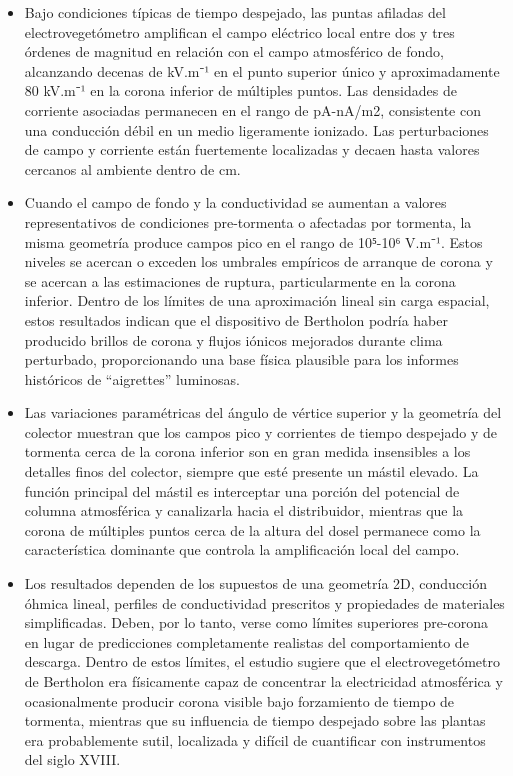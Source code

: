 \documentclass[
]{article}
\begin{document}
\begin{itemize}
\item
  Bajo condiciones típicas de tiempo despejado, las puntas afiladas del
  electrovegetómetro amplifican el campo eléctrico local entre dos y
  tres órdenes de magnitud en relación con el campo atmosférico de
  fondo, alcanzando decenas de kV.m⁻¹ en el punto superior único y
  aproximadamente 80 kV.m⁻¹ en la corona inferior de múltiples puntos.
  Las densidades de corriente asociadas permanecen en el rango de
  pA-nA/m2, consistente con una conducción débil en un medio ligeramente
  ionizado. Las perturbaciones de campo y corriente están fuertemente
  localizadas y decaen hasta valores cercanos al ambiente dentro de cm.
\item
  Cuando el campo de fondo y la conductividad se aumentan a valores
  representativos de condiciones pre-tormenta o afectadas por tormenta,
  la misma geometría produce campos pico en el rango de 10⁵-10⁶ V.m⁻¹.
  Estos niveles se acercan o exceden los umbrales empíricos de arranque
  de corona y se acercan a las estimaciones de ruptura, particularmente
  en la corona inferior. Dentro de los límites de una aproximación
  lineal sin carga espacial, estos resultados indican que el dispositivo
  de Bertholon podría haber producido brillos de corona y flujos iónicos
  mejorados durante clima perturbado, proporcionando una base física
  plausible para los informes históricos de ``aigrettes'' luminosas.
\item
  Las variaciones paramétricas del ángulo de vértice superior y la
  geometría del colector muestran que los campos pico y corrientes de
  tiempo despejado y de tormenta cerca de la corona inferior son en gran
  medida insensibles a los detalles finos del colector, siempre que esté
  presente un mástil elevado. La función principal del mástil es
  interceptar una porción del potencial de columna atmosférica y
  canalizarla hacia el distribuidor, mientras que la corona de múltiples
  puntos cerca de la altura del dosel permanece como la característica
  dominante que controla la amplificación local del campo.
\item
  Los resultados dependen de los supuestos de una geometría 2D,
  conducción óhmica lineal, perfiles de conductividad prescritos y
  propiedades de materiales simplificadas. Deben, por lo tanto, verse
  como límites superiores pre-corona en lugar de predicciones
  completamente realistas del comportamiento de descarga. Dentro de
  estos límites, el estudio sugiere que el electrovegetómetro de
  Bertholon era físicamente capaz de concentrar la electricidad
  atmosférica y ocasionalmente producir corona visible bajo forzamiento
  de tiempo de tormenta, mientras que su influencia de tiempo despejado
  sobre las plantas era probablemente sutil, localizada y difícil de
  cuantificar con instrumentos del siglo XVIII.
\end{itemize}
\end{document}
